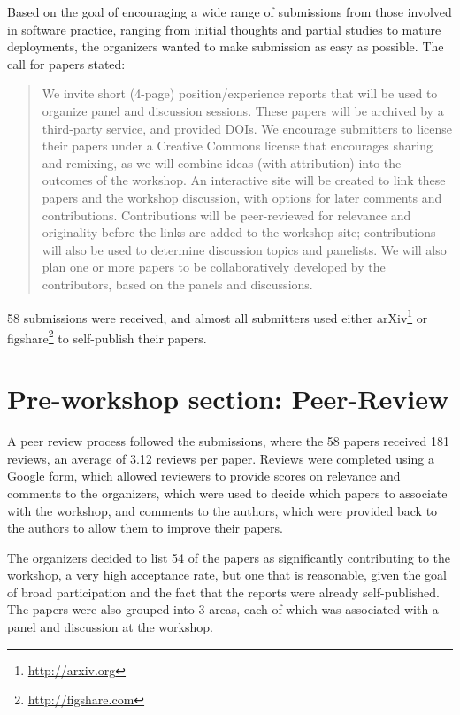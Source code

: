 \documentclass[11pt, oneside]{amsart}
\begin{document}
Based on the goal of encouraging a wide range of submissions from those involved in software practice, ranging from initial thoughts and partial studies to mature deployments, the organizers wanted to make submission as easy as possible.  The call for papers stated:

\begin{quote}
We invite short (4-page) position/experience reports that will be used to organize panel and discussion sessions.  These papers will be archived by a third-party service, and provided DOIs. We encourage submitters to license their papers under a Creative Commons license that encourages sharing and remixing, as we will combine ideas (with attribution) into the outcomes of the workshop.  An interactive site will be created to link these papers and the workshop discussion, with options for later comments and contributions.  Contributions will be peer-reviewed for relevance and originality before the links are added to the workshop site; contributions will also be used to determine discussion topics and panelists.  We will also plan one or more papers to be collaboratively developed by the contributors, based on the panels and discussions.
\end{quote}

58 submissions were received, and almost all submitters used either arXiv\footnote{\url{http://arxiv.org}} or figshare\footnote{\url{http://figshare.com}} to self-publish their papers.  

\section{Pre-workshop section: Peer-Review}

A peer review process followed the submissions, where the 58 papers received 181 reviews, an average of 3.12 reviews per paper.  Reviews were completed using a Google form, which allowed reviewers to provide scores on relevance and comments to the organizers, which were used to decide which papers to associate with the workshop, and comments to the authors, which were provided back to the authors to allow them to improve their papers.

The organizers decided to list 54 of the papers as significantly contributing to the workshop, a very high acceptance rate, but one that is reasonable, given the goal of broad participation and the fact that the reports were already self-published.  The papers were also grouped into 3 areas, each of which was associated with a panel and discussion at the workshop.
\end{document}
